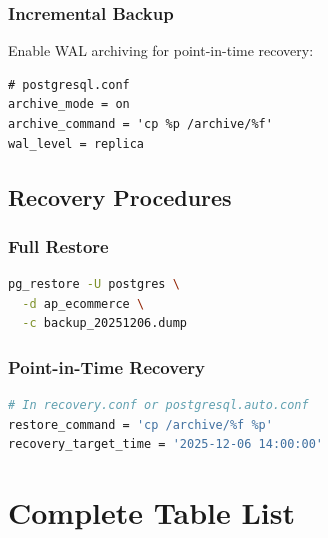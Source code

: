 \documentclass[12pt,a4paper]{report}
\begin{document}
\subsection{Incremental Backup}

Enable WAL archiving for point-in-time recovery:

\begin{lstlisting}[caption=PostgreSQL WAL Configuration]
# postgresql.conf
archive_mode = on
archive_command = 'cp %p /archive/%f'
wal_level = replica
\end{lstlisting}

\section{Recovery Procedures}

\subsection{Full Restore}

\begin{lstlisting}[language=bash, caption=Database Restore]
pg_restore -U postgres \
  -d ap_ecommerce \
  -c backup_20251206.dump
\end{lstlisting}

\subsection{Point-in-Time Recovery}

\begin{lstlisting}[language=bash, caption=Point-in-Time Recovery]
# In recovery.conf or postgresql.auto.conf
restore_command = 'cp /archive/%f %p'
recovery_target_time = '2025-12-06 14:00:00'
\end{lstlisting}

\appendix

\chapter{Complete Table List}
\end{document}
